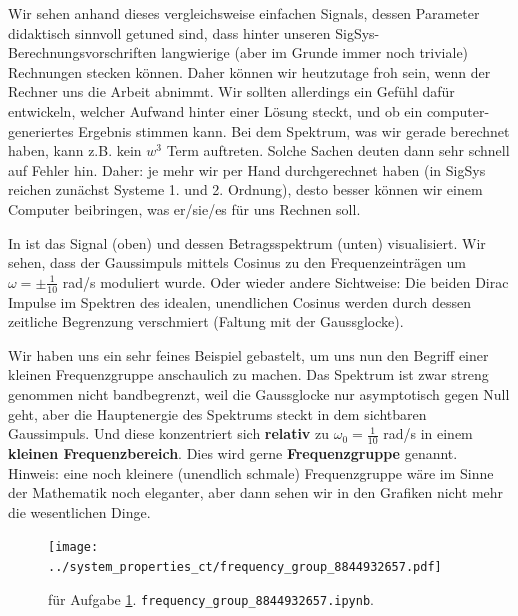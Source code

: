 \begin{Loesung}
Wir sehen anhand dieses vergleichsweise einfachen Signals, dessen Parameter
didaktisch sinnvoll getuned sind, dass hinter unseren SigSys-Berechnungsvorschriften
langwierige (aber im Grunde immer noch triviale)
Rechnungen stecken können. Daher können wir heutzutage froh sein,
wenn der Rechner uns die Arbeit abnimmt.
Wir sollten allerdings ein Gefühl dafür entwickeln, welcher Aufwand hinter
einer Lösung steckt, und ob ein computer-generiertes Ergebnis stimmen
kann. Bei dem Spektrum, was wir gerade berechnet haben, kann z.B.
kein $w^3$ Term auftreten. Solche Sachen deuten dann sehr schnell auf Fehler hin.
Daher: je mehr wir per Hand durchgerechnet haben (in SigSys reichen zunächst
Systeme 1. und 2. Ordnung), desto besser können wir einem Computer beibringen, was er/sie/es
für uns Rechnen soll.

In  ist das Signal (oben) und dessen
Betragsspektrum (unten) visualisiert.
%
Wir sehen, dass der Gaussimpuls mittels Cosinus zu den Frequenzeinträgen
um $\omega=\pm \frac{1}{10}$ rad/s
moduliert wurde.
Oder wieder andere Sichtweise: Die beiden Dirac Impulse im Spektren des idealen,
unendlichen Cosinus werden durch dessen zeitliche Begrenzung verschmiert
(Faltung mit der Gaussglocke).
%

Wir haben uns ein sehr feines Beispiel gebastelt, um uns nun den
Begriff einer kleinen Frequenzgruppe anschaulich zu machen.
Das Spektrum ist zwar streng genommen nicht bandbegrenzt, weil die Gaussglocke
nur asymptotisch gegen Null geht, aber die Hauptenergie des Spektrums
steckt in dem sichtbaren Gaussimpuls.
Und diese konzentriert sich \textbf{relativ} zu $\omega_0=\frac{1}{10}$ rad/s in einem
\textbf{kleinen Frequenzbereich}. Dies wird gerne \textbf{Frequenzgruppe} genannt.
Hinweis: eine noch kleinere (unendlich schmale) Frequenzgruppe wäre im Sinne der
Mathematik noch eleganter, aber dann sehen wir in den Grafiken nicht mehr die
wesentlichen Dinge.
\end{Loesung}

\begin{figure}[h]
\centering
\texttt{[image: ../system\_properties\_ct/frequency\_group\_8844932657.pdf]}
\caption{für Aufgabe \ref{fig:frequency_group_8844932657}. \texttt{frequency\_group\_8844932657.ipynb}.}
\label{fig:frequency_group_8844932657}
\end{figure}


